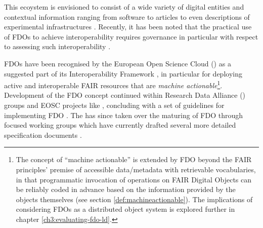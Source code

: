 This ecoystem is envisioned to consist of a wide variety of digital entities and contextual information ranging from software to articles to even descriptions of experimental infrastructures \cite{Azeroual 2022}.
Recently, it has been noted that the practical use of FDOs to achieve interoperability requires governance in particular with respect to assessing such interoperability \cite{Wilkinson 2023a}.

FDOs have been recognised by the European Open Science Cloud () as a suggested part of its Interoperability Framework \cite{Kurowski 2021}, in particular for deploying active and interoperable FAIR resources that are \emph{machine actionable}\footnote{
  The concept of ``machine actionable'' is extended by FDO beyond the FAIR principles' premise of accessible data/metadata with retrievable vocabularies, in that programmatic invocation of operations on FAIR Digital Objects can be reliably coded in advance based on the information provided by the objects themselves (see section \vref{def:machineactionable}).
  The implications of considering FDOs as a distributed object system is explored further in chapter \vref{ch3:evaluating-fdo-ld}.
}. Development of the FDO concept continued within Research Data Alliance () groups and EOSC projects like , concluding with a set of guidelines for implementing FDO \cite{Bonino 2019}. The  has since taken over the maturing of FDO through focused working groups which have currently drafted several more detailed specification documents \cite{FDO Specs}.


